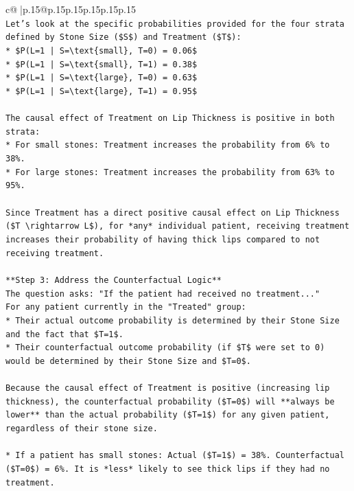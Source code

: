 \documentclass{article}
\begin{document}
{\begin{supertabular}{c@{$\;$}|p{.15\linewidth}@{}p{.15\linewidth}p{.15\linewidth}p{.15\linewidth}p{.15\linewidth}p{.15\linewidth}}
{{{\\ 
\texttt{Let's look at the specific probabilities provided for the four strata defined by Stone Size (\$S\$) and Treatment (\$T\$):} \\
\texttt{*   \$P(L=1 | S=\textbackslash{}text\{small\}, T=0) = 0.06\$} \\
\texttt{*   \$P(L=1 | S=\textbackslash{}text\{small\}, T=1) = 0.38\$} \\
\texttt{*   \$P(L=1 | S=\textbackslash{}text\{large\}, T=0) = 0.63\$} \\
\texttt{*   \$P(L=1 | S=\textbackslash{}text\{large\}, T=1) = 0.95\$} \\
\\ 
\texttt{The causal effect of Treatment on Lip Thickness is positive in both strata:} \\
\texttt{*   For small stones: Treatment increases the probability from 6\% to 38\%.} \\
\texttt{*   For large stones: Treatment increases the probability from 63\% to 95\%.} \\
\\ 
\texttt{Since Treatment has a direct positive causal effect on Lip Thickness (\$T \textbackslash{}rightarrow L\$), for *any* individual patient, receiving treatment increases their probability of having thick lips compared to not receiving treatment.} \\
\\ 
\texttt{**Step 3: Address the Counterfactual Logic**} \\
\texttt{The question asks: "If the patient had received no treatment..."} \\
\texttt{For any patient currently in the "Treated" group:} \\
\texttt{*   Their actual outcome probability is determined by their Stone Size and the fact that \$T=1\$.} \\
\texttt{*   Their counterfactual outcome probability (if \$T\$ were set to 0) would be determined by their Stone Size and \$T=0\$.} \\
\\ 
\texttt{Because the causal effect of Treatment is positive (increasing lip thickness), the counterfactual probability (\$T=0\$) will **always be lower** than the actual probability (\$T=1\$) for any given patient, regardless of their stone size.} \\
\\ 
\texttt{*   If a patient has small stones: Actual (\$T=1\$) = 38\%. Counterfactual (\$T=0\$) = 6\%. It is *less* likely to see thick lips if they had no treatment.} \\
}}}
\end{supertabular}}
\end{document}
